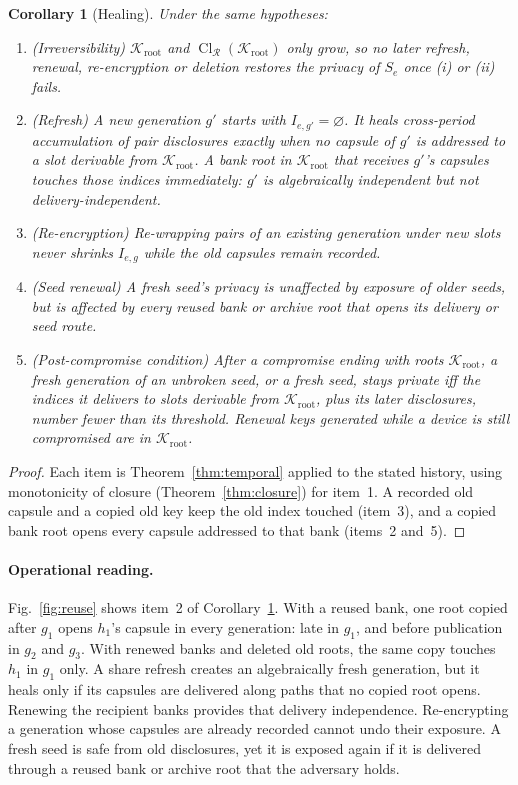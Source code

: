 \documentclass[pdflatex,sn-mathphys-num]{sn-jnl}%
\theoremstyle{plain}
\newtheorem{corollary}[theorem]{Corollary}
\theoremstyle{definition}
\newcommand{\Cl}{\operatorname{Cl}}
\begin{document}
\begin{corollary}[Healing]\label{cor:healing}
Under the same hypotheses:
\begin{enumerate}
\item (Irreversibility) $\mathcal K_{\mathrm{root}}$ and $\Cl_{\mathcal R}(\mathcal K_{\mathrm{root}})$ only grow, so no later refresh, renewal, re-encryption or deletion restores the privacy of $S_e$ once (i) or (ii) fails.
\item (Refresh) A new generation $g'$ starts with $I_{e,g'}=\varnothing$. It heals cross-period accumulation of pair disclosures exactly when no capsule of $g'$ is addressed to a slot derivable from $\mathcal K_{\mathrm{root}}$. A bank root in $\mathcal K_{\mathrm{root}}$ that receives $g'$'s capsules touches those indices immediately: $g'$ is algebraically independent but not delivery-independent.
\item (Re-encryption) Re-wrapping pairs of an existing generation under new slots never shrinks $I_{e,g}$ while the old capsules remain recorded.
\item (Seed renewal) A fresh seed's privacy is unaffected by exposure of older seeds, but is affected by every reused bank or archive root that opens its delivery or seed route.
\item (Post-compromise condition) After a compromise ending with roots $\mathcal K_{\mathrm{root}}$, a fresh generation of an unbroken seed, or a fresh seed, stays private iff the indices it delivers to slots derivable from $\mathcal K_{\mathrm{root}}$, plus its later disclosures, number fewer than its threshold. Renewal keys generated while a device is still compromised are in $\mathcal K_{\mathrm{root}}$.
\end{enumerate}
\end{corollary}
\begin{proof}
Each item is Theorem~\ref{thm:temporal} applied to the stated history, using monotonicity of closure (Theorem~\ref{thm:closure}) for item~1. A recorded old capsule and a copied old key keep the old index touched (item~3), and a copied bank root opens every capsule addressed to that bank (items~2 and~5).
\end{proof}

\paragraph{Operational reading.}
Fig.~\ref{fig:reuse} shows item~2 of Corollary~\ref{cor:healing}. With a reused bank, one root copied after $g_1$ opens $h_1$'s capsule in every generation: late in $g_1$, and before publication in $g_2$ and $g_3$. With renewed banks and deleted old roots, the same copy touches $h_1$ in $g_1$ only. A share refresh creates an algebraically fresh generation, but it heals only if its capsules are delivered along paths that no copied root opens. Renewing the recipient banks provides that delivery independence. Re-encrypting a generation whose capsules are already recorded cannot undo their exposure. A fresh seed is safe from old disclosures, yet it is exposed again if it is delivered through a reused bank or archive root that the adversary holds.
\end{document}
